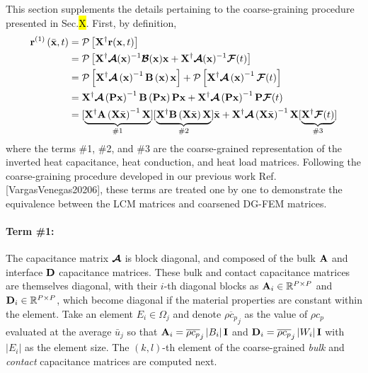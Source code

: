 This section supplements the details pertaining to the coarse-graining procedure presented in Sec.\hl{X}. First, by definition,
\begin{subequations}
    \begin{align}
        \mathbf{r}^{(1)}\left(\bar{\mathbf{x}},t\right) &= \mathcal{P}\left[\mathbf{X}^{\dagger}\mathbf{r}(\mathbf{x},t)\right]\\
        &= \mathcal{P}\left[\mathbf{X}^{\dagger}\boldsymbol{\mathcal{A}}(\mathbf{x})^{-1}\boldsymbol{\mathcal{B}}(\mathbf{x})\mathbf{x} + \mathbf{X}^{\dagger}\boldsymbol{\mathcal{A}}(\mathbf{x})^{-1}\boldsymbol{\mathcal{F}}(t)\right]\\
        &= \mathcal{P}\left[\mathbf{X}^{\dagger}\boldsymbol{\mathcal{A}}\left(\mathbf{x}\right)^{-1}\mathbf{B}\left(\mathbf{x}\right)\mathbf{x}\right] + \mathcal{P}\left[\mathbf{X}^{\dagger}\boldsymbol{\mathcal{A}}\left(\mathbf{x}\right)^{-1}\boldsymbol{\mathcal{F}}(t)\right]\\
        &= \mathbf{X}^{\dagger}\boldsymbol{\mathcal{A}}\left(\mathbf{P}\mathbf{x}\right)^{-1}\mathbf{B}\left(\mathbf{P}\mathbf{x}\right)\mathbf{P}\mathbf{x} + \mathbf{X}^{\dagger}\boldsymbol{\mathcal{A}}\left(\mathbf{P}\mathbf{x}\right)^{-1}\mathbf{P}\boldsymbol{\mathcal{F}}(t)\\
        &=[\underbrace{\mathbf{X}^{\dagger}\mathbf{A}\left(\mathbf{X}\bar{\mathbf{x}}\right)^{-1}\mathbf{X}}_{\# 1}][\underbrace{\mathbf{X}^{\dagger}\mathbf{B}\left(\mathbf{X}\bar{\mathbf{x}}\right)\mathbf{X}}_{\# 2}]\bar{\mathbf{x}} + \mathbf{X}^{\dagger}\boldsymbol{\mathcal{A}}\left(\mathbf{X}\bar{\mathbf{x}}\right)^{-1}\mathbf{X}[\underbrace{\mathbf{X}^{\dagger}\boldsymbol{\mathcal{F}}(t)}_{\# 3}]
    \end{align}
\end{subequations}
where the terms \#1, \#2, and \#3 are the coarse-grained representation of the inverted heat capacitance, heat conduction, and heat load matrices. Following the coarse-graining procedure developed in our previous work Ref. [VargasVenegas20206], these terms are treated one by one to demonstrate the equivalence between the LCM matrices and coarsened DG-FEM matrices.

\paragraph{Term \#1:} The capacitance matrix $\boldsymbol{\mathcal{A}}$ is block diagonal, and composed of the bulk $\mathbf{A}$ and interface $\mathbf{D}$ capacitance matrices. These bulk and contact capacitance matrices are themselves diagonal, with their $i$-th diagonal blocks as $\mathbf{A}_i\in\mathbb{R}^{P\times P}$ and $\mathbf{D}_i\in\mathbb{R}^{P\times P}$, which become diagonal if the material properties are constant within the element. Take an element $E_i\in\Omega_j$ and denote $\overline{\rho c_p}_j$ as the value of $\rho c_p$ evaluated at the average $\bar{u}_j$ so that $\mathbf{A}_i=\overline{\rho c_p}_j\left|B_i\right|\mathbf{I}$ and $\mathbf{D}_i=\overline{\rho c_p}_j\left|W_i\right|\mathbf{I}$ with $\left|E_i\right|$ as the element size. The $(k,l)$-th element of the coarse-grained \emph{bulk} and \emph{contact} capacitance matrices are computed next.

